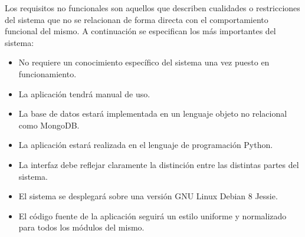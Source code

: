 Los requisitos no funcionales son aquellos que describen cualidades o restricciones del sistema que no se relacionan de forma directa con el comportamiento funcional del mismo. A continuación se especifican los más importantes del sistema:
\begin{itemize}
\item No requiere un conocimiento específico del sistema una vez puesto en funcionamiento.
\item La aplicación tendrá manual de uso.
\item La base de datos estará implementada en un lenguaje objeto no relacional como MongoDB.
\item La aplicación estará realizada en el lenguaje de programación Python.
\item La interfaz debe reflejar claramente la distinción entre las distintas partes del sistema.
\item El sistema se desplegará sobre una versión GNU Linux Debian 8 Jessie.
\item El código fuente de la aplicación seguirá un estilo uniforme y normalizado para todos los módulos del mismo.
\end{itemize}
